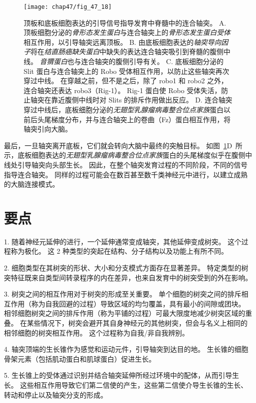 \begin{figure}[htbp]
	\centering
	\texttt{[image: chap47/fig\_47\_18]}
	\caption{顶板和底板细胞表达的引导信号指导发育中脊髓中的连合轴突。
		A. 顶板细胞分泌的\textit{骨形态发生蛋白}与连合轴突上的\textit{骨形态发生蛋白受体}相互作用，以引导轴突远离顶板。
		B. 由底板细胞表达的\textit{轴突导向因子}将在\textit{结直肠癌缺失蛋白}中缺失的表达连合轴突吸引到脊髓的腹侧中线。
		\textit{音猬蛋白}也与连合轴突的腹侧引导有关。
		C. 底板细胞分泌的 Slit 蛋白与连合轴突上的 Robo 受体相互作用，以防止这些轴突再次穿过中线。
		在穿越之前，但不是之后，除了 robo1 和 robo2 之外，连合轴突还表达 robo3（Rig-1）。
		Rig-1 蛋白使 Robo 受体失活，防止轴突在靠近腹侧中线时对 Slits 的排斥作用做出反应。
		D. 连合轴突穿过中线后，底板细胞分泌的\textit{无翅型乳腺瘤病毒整合位点家族}蛋白以前后头尾梯度分布，并与连合轴突上的卷曲（Fz）蛋白相互作用，将轴突引向大脑。}
	\label{fig:47_18}
\end{figure}


最后，一旦轴突离开底板，它们就会转向大脑中最终的突触目标。
如图~\ref{fig:47_18}D~所示，底板细胞表达的\textit{无翅型乳腺瘤病毒整合位点家族}蛋白的头尾梯度似乎在腹侧中线处引导轴突向头部生长。
因此，在整个轴突发育过程的不同阶段，不同的信号指导连合轴突。
同样的过程可能会在数百甚至数千类神经元中进行，以建立成熟的大脑连接模式。



\section{要点}

1. 随着神经元延伸的进行，一个延伸通常变成轴突，其他延伸变成树突。
这个过程称为极化。
这 2 种类型的突起在结构、分子结构以及功能上有所不同。


2. 细胞类型在其树突的形状、大小和分支模式方面存在显著差异。
特定类型的树突特征既来自类型间转录程序的内在差异，也来自发育中的树突受到的外在影响。


3. 树突之间的相互作用对于树突的形成至关重要。
单个细胞的树突之间的排斥相互作用（称为自我回避的过程）导致区域的均匀覆盖，具有最小的间隙或团块。
相邻细胞树突之间的排斥作用（称为平铺的过程）可最大限度地减少树突区域的重叠。
在某些情况下，树突会避开其自身神经元的其他树突，但会与名义上相同的相邻细胞的树突相互作用。
这个过程称为自我/非自我辨别。


4. 轴突顶端的生长锥作为感觉和运动元件，引导轴突到达目的地。
生长锥的细胞骨架元素（包括肌动蛋白和肌球蛋白）促进生长。


5. 生长锥上的受体通过识别并结合轴突延伸所经过环境中的配体，从而引导生长。
这些相互作用导致它们第二信使的产生，这些第二信使介导生长锥的生长、转动和停止以及轴突分支的形成。


